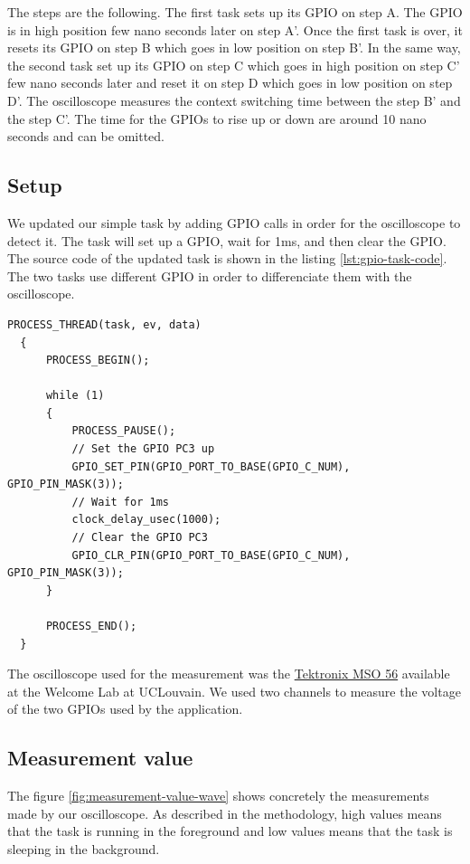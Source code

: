 The steps are the following.
The first task sets up its GPIO on step A.
The GPIO is in high position few nano seconds later on step A'.
Once the first task is over, it resets its GPIO on step B which goes in low position on step B'.
In the same way, the second task set up its GPIO on step C which goes in high position on step C' few nano seconds later and reset it on step D which goes in low position on step D'.
The oscilloscope measures the context switching time between the step B' and the step C'.
The time for the GPIOs to rise up or down are around 10 nano seconds and can be omitted.

\subsection{Setup}

We updated our simple task by adding GPIO calls in order for the oscilloscope to detect it.
The task will set up a GPIO, wait for 1ms, and then clear the GPIO.
The source code of the updated task is shown in the listing \ref{lst:gpio-task-code}.
The two tasks use different GPIO in order to differenciate them with the oscilloscope.

\begin{lstlisting}[style=CStyle, label={lst:gpio-task-code}, caption={Source code of the task with GPIO calls}]
  PROCESS_THREAD(task, ev, data)
  {
      PROCESS_BEGIN();
  
      while (1)
      {
          PROCESS_PAUSE();
          // Set the GPIO PC3 up
          GPIO_SET_PIN(GPIO_PORT_TO_BASE(GPIO_C_NUM), GPIO_PIN_MASK(3));
          // Wait for 1ms
          clock_delay_usec(1000);
          // Clear the GPIO PC3
          GPIO_CLR_PIN(GPIO_PORT_TO_BASE(GPIO_C_NUM), GPIO_PIN_MASK(3));
      }
  
      PROCESS_END();
  }
\end{lstlisting}

The oscilloscope used for the measurement was the \href{https://www.tek.com/oscilloscope/mso56}{Tektronix MSO 56} available at the Welcome Lab at UCLouvain.
We used two channels to measure the voltage of the two GPIOs used by the application.

\subsection{Measurement value}

The figure \ref{fig:measurement-value-wave} shows concretely the measurements made by our oscilloscope.
As described in the methodology, high values means that the task is running in the foreground and low values means that the task is sleeping in the background.

